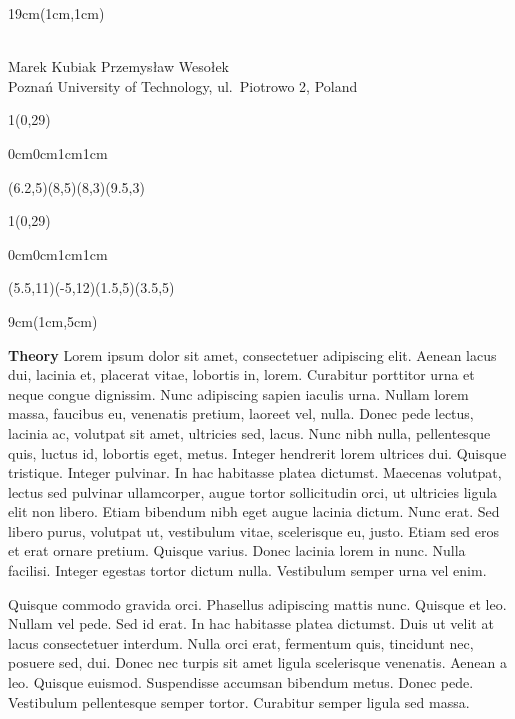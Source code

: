 \documentclass[oneside,final]{beamer}
\newenvironment{pgfdrawing}{
\begin{textblock}{1}(0,29)
\begin{pgfpicture}{0cm}{0cm}{1cm}{1cm}
\begin{pgfscope}}{
\end{pgfscope}
\end{pgfpicture}
\end{textblock}
}
\newcommand\showgrid{
\begin{pgfdrawing}
    \color{red}
    \pgfsetlinewidth{0.2pt}
    \pgfgrid[step={\pgfpoint{1cm}{1cm}}]{\pgfxy(0,0)}{\pgfxy(21,30)}
    \pgfsetlinewidth{1pt}
    \pgfgrid[step={\pgfpoint{5cm}{5cm}}]{\pgfxy(0,0)}{\pgfxy(21,30)}
    \pgfputat{\pgfxy(0.2,0.2)}{\pgfbox[left,bottom]{0,0}}
    \pgfputat{\pgfxy(0,0)}{\pgfcircle[fill]{\pgfxy(0,0)}{0.1cm}}
\end{pgfdrawing}
}
\newcommand\drawarrow[1]{
\begin{pgfdrawing}
\color{black}
\pgfsetlinewidth{2pt}
\pgfsetendarrow{\pgfarrowtriangle{7pt}}
\pgfsetstartarrow{\pgfarrowcircle{2pt}}
#1
\end{pgfdrawing}
}
\begin{document}

\begin{textblock*}{19cm}(1cm,1cm)
\noindent%
\begin{beamerboxesrounded}[shadow=false,upper=myhead,lower=myhead]{}
\centering {} \\[.5cm]
\Large Marek Kubiak \hspace{2cm} Przemysław Wesołek \\[.3cm]
\large Poznań University of Technology, ul.~Piotrowo 2, Poland
\end{beamerboxesrounded}
\end{textblock*}

\drawarrow{\color{red}\pgfxycurve(6.2,5)(8,5)(8,3)(9.5,3)}
\drawarrow{\color{red}\pgfxycurve(5.5,11)(-5,12)(1.5,5)(3.5,5)}

\begin{textblock*}{9cm}(1cm,5cm)\noindent%
\begin{beamerboxesrounded}[shadow=false,upper=block1up,lower=block1down]{\large\textbf{Theory}}
Lorem ipsum dolor sit amet, consectetuer adipiscing elit. Aenean lacus dui, lacinia et, placerat vitae, lobortis in, lorem. Curabitur porttitor urna et neque congue dignissim. Nunc adipiscing sapien iaculis urna. Nullam lorem massa, faucibus eu, venenatis pretium, laoreet vel, nulla. Donec pede lectus, lacinia ac, volutpat sit amet, ultricies sed, lacus. Nunc nibh nulla, pellentesque quis, luctus id, lobortis eget, metus. Integer hendrerit lorem ultrices dui. Quisque tristique. Integer pulvinar. In hac habitasse platea dictumst. Maecenas volutpat, lectus sed pulvinar ullamcorper, augue tortor sollicitudin orci, ut ultricies ligula elit non libero. Etiam bibendum nibh eget augue lacinia dictum. Nunc erat. Sed libero purus, volutpat ut, vestibulum vitae, scelerisque eu, justo. Etiam sed eros et erat ornare pretium. Quisque varius. Donec lacinia lorem in nunc. Nulla facilisi. Integer egestas tortor dictum nulla. Vestibulum semper urna vel enim.
\par\medskip Quisque commodo gravida orci. Phasellus adipiscing mattis nunc. Quisque et leo. Nullam vel pede. Sed id erat. In hac habitasse platea dictumst. Duis ut velit at lacus consectetuer interdum. Nulla orci erat, fermentum quis, tincidunt nec, posuere sed, dui. Donec nec turpis sit amet ligula scelerisque venenatis. Aenean a leo. Quisque euismod. Suspendisse accumsan bibendum metus. Donec pede. Vestibulum pellentesque semper tortor. Curabitur semper ligula sed massa.
\end{beamerboxesrounded}
\end{textblock*}
\end{document}
